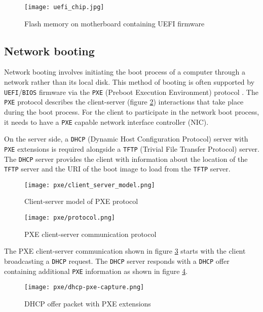 \documentclass[../main.tex]{subfiles}
\begin{document}
\begin{figure}[H]
  \centering
  \texttt{[image: uefi\_chip.jpg]}
  \caption{Flash memory on motherboard containing UEFI firmware \cite{uefi_chip_img_ref}}
  \label{fig:uefi_chip}
\end{figure}

\subsection{Network booting}
\label{subsec:network-booting}

Network booting involves initiating the boot process of a computer through a network rather than its local disk.
This method of booting is often supported by \texttt{UEFI}/\texttt{BIOS} firmware via the
\texttt{PXE} (Preboot Execution Environment) protocol \cite{pxespec}. The \texttt{PXE} protocol
describes the client-server (figure \ref{fig:pxe_client_server_model}) interactions that take place during the boot process.
For the client to participate in the network boot process, it needs to have a \texttt{PXE} capable network interface controller (NIC).

On the server side, a \texttt{DHCP} (Dynamic Host Configuration Protocol) server with \texttt{PXE} extensions is required
alongside a \texttt{TFTP} (Trivial File Transfer Protocol) server. The \texttt{DHCP} server provides the client with
information about the location of the \texttt{TFTP} server and the URI of the boot image to load from the \texttt{TFTP} server.

\begin{figure}[H]
  \centering
  \texttt{[image: pxe/client\_server\_model.png]}
  \caption{Client-server model of PXE protocol \cite{pxespec}}
  \label{fig:pxe_client_server_model}
\end{figure}

\begin{figure}[H]
  \centering
  \texttt{[image: pxe/protocol.png]}
  \caption{PXE client-server communication protocol \cite{pxespec_protocol}}
  \label{fig:pxe_protocol}
\end{figure}

The PXE client-server communication shown in figure \ref{fig:pxe_protocol} starts with the client
broadcasting a \texttt{DHCP} request. The \texttt{DHCP} server responds with a \texttt{DHCP} offer
containing additional \texttt{PXE} information as shown in figure \ref{fig:pxe_dhcp_offer}.

\begin{figure}[H]
  \centering
  \texttt{[image: pxe/dhcp-pxe-capture.png]}
  \caption{DHCP offer packet with PXE extensions \cite{pxespec_dhcp_options}}
  \label{fig:pxe_dhcp_offer}
\end{figure}
\end{document}
